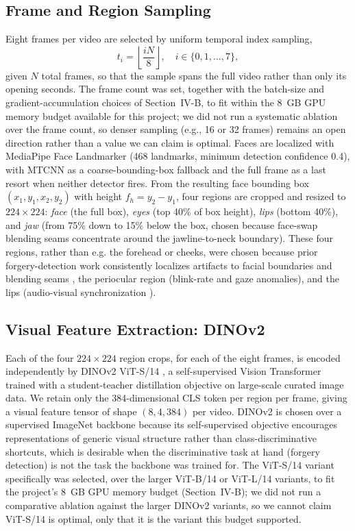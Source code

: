 \documentclass[conference]{IEEEtran}
\begin{document}
\subsection{Frame and Region Sampling}
Eight frames per video are selected by uniform temporal index sampling,
\begin{equation}
t_i = \left\lfloor \frac{iN}{8} \right\rfloor, \quad i \in \{0,1,\dots,7\},
\end{equation}
given $N$ total frames, so that the sample spans the full video rather than
only its opening seconds. The frame count was set, together with the batch-size and
gradient-accumulation choices of Section~IV-B, to fit within the 8~GB GPU
memory budget available for this project; we did not run a systematic
ablation over the frame count, so denser sampling (e.g., 16 or 32 frames)
remains an open direction rather than a value we can claim is optimal.
Faces are localized with MediaPipe Face Landmarker \cite{lugaresi2019mediapipe} (468
landmarks, minimum detection confidence 0.4), with MTCNN \cite{zhang2016mtcnn} as a coarse-bounding-box
fallback and the full frame as a last resort when neither detector fires.
From the resulting face bounding box $(x_1,y_1,x_2,y_2)$ with height
$f_h = y_2 - y_1$, four regions are cropped and resized to $224{\times}224$:
\textit{face} (the full box), \textit{eyes} (top 40\% of box height),
\textit{lips} (bottom 40\%), and \textit{jaw} (from 75\% down to 15\% below
the box, chosen because face-swap blending seams concentrate around the
jawline-to-neck boundary). These four regions, rather than e.g. the
forehead or cheeks, were chosen because prior forgery-detection work
consistently localizes artifacts to facial boundaries and blending seams
\cite{li2020facexray}, the periocular region (blink-rate and gaze
anomalies), and the lips (audio-visual synchronization
\cite{haliassos2021lipforensics}).

\subsection{Visual Feature Extraction: DINOv2}
Each of the four $224{\times}224$ region crops, for each of the eight
frames, is encoded independently by DINOv2 ViT-S/14
\cite{oquab2023dinov2}, a self-supervised Vision Transformer
\cite{dosovitskiy2021vit} trained with a
student-teacher distillation objective on large-scale curated image data.
We retain only the 384-dimensional CLS token per region per frame, giving a
visual feature tensor of shape $(8, 4, 384)$ per video. DINOv2 is chosen
over a supervised ImageNet backbone because its self-supervised objective
encourages representations of generic visual structure rather than
class-discriminative shortcuts, which is desirable when the discriminative
task at hand (forgery detection) is not the task the backbone was trained
for. The ViT-S/14 variant specifically was selected, over the larger
ViT-B/14 or ViT-L/14 variants, to fit the project's 8~GB GPU memory budget
(Section~IV-B); we did not run a comparative ablation against the larger
DINOv2 variants, so we cannot claim ViT-S/14 is optimal, only that it is
the variant this budget supported.
\end{document}
